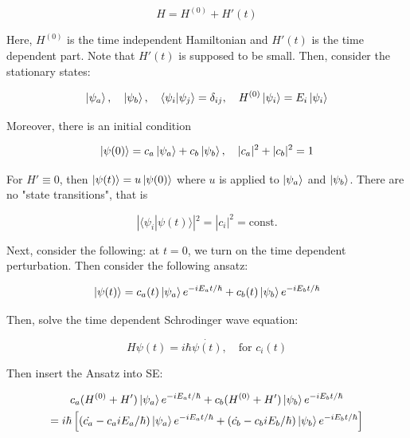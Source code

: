 \documentclass{article}
\newtheorem{one minute paper}[theorem]{One Minute Paper}
\begin{document}
\begin{equation}
    H = H^{(0)} + H'(t)
\end{equation}

Here, $H^{(0)}$ is the time independent Hamiltonian and $H'(t)$ is the time dependent part. Note that $H'(t)$ is supposed to be small. Then, consider the stationary states:

\begin{equation}
    \ket{\psi_a}, \quad \ket{\psi_b}, \quad \langle \psi_i|\psi_j \rangle = \delta_{ij}, \quad H^{(0)}\ket{\psi_i} = E_i\ket{\psi_i}
\end{equation}

Moreover, there is an initial condition 

\begin{equation}
    \ket{\psi(0)} = c_a\ket{\psi_a} + c_b\ket{\psi_b}, \quad |c_a|^2 + |c_b|^2 = 1
\end{equation}

For $H' \equiv 0$, then $\ket{\psi(t)} = u \ket{\psi(0)}$ where $u$ is applied to $\ket{\psi_a}$ and $\ket{\psi_b}$. There are no "state transitions", that is 

\begin{equation}
    | \langle \psi_i | \psi(t) \rangle |^2 = |c_i|^2 = \text{const.}
\end{equation}

Next, consider the following: at $t=0$, we turn on the time dependent perturbation. Then consider the following ansatz:

\begin{equation}
    \ket{\psi(t)} = c_a(t)\ket{\psi_a}e^{-iE_a t/\hbar} + c_b(t)\ket{\psi_b}e^{-iE_bt/\hbar}
\end{equation}

Then, solve the time dependent Schrodinger wave equation: 

\begin{equation}
    H\psi(t) = i\hbar \dot{\psi(t)}, \quad \text{for $c_i(t)$} 
\end{equation}

Then insert the Ansatz into SE:

\begin{multline}
    c_a (H^{(0)} + H')\ket{\psi_a}e^{-iE_at/\hbar} + c_b(H^{(0)} + H')\ket{\psi_b}e^{-iE_bt/\hbar} \\
    = i\hbar \left[ (\dot{c_a} - c_a iE_a/\hbar)\ket{\psi_a}e^{-iE_at/\hbar} + (\dot{c_b} - c_biE_b/\hbar)\ket{\psi_b}e^{-iE_bt/\hbar} \right] 
\end{multline}
\end{document}
